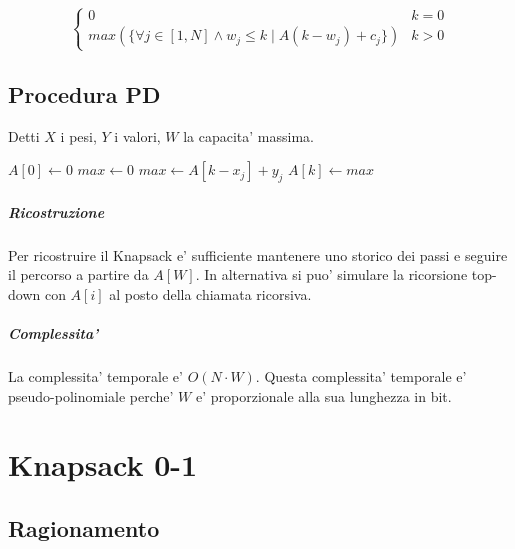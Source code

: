 \[
    \begin{cases}
        \text{$0$} & \text{$k = 0$} \\
        \text{$max(\{\forall j \in [1,N] \land w_j \leq k \mid A(k - w_j) + c_j\})$} & \text{$k > 0$}
    \end{cases}
\]

\newpage

\section{Procedura PD}

Detti $X$ i pesi, $Y$ i valori, $W$ la capacita' massima.

\begin{algorithm}
    \begin{algorithmic}
            \State $A[0] \gets 0$
                \State $max \gets 0$
                        \State $max \gets A[k - x_j] + y_j$
                    \EndIf
                \EndFor
                \State $A[k] \gets max$
            \EndFor
        \EndProcedure
    \end{algorithmic}
\end{algorithm}

\paragraph{Ricostruzione}

Per ricostruire il Knapsack e' sufficiente mantenere uno storico dei passi e seguire il percorso a partire da $A[W]$.
In alternativa si puo' simulare la ricorsione top-down con $A[i]$ al posto della chiamata ricorsiva.

\paragraph{Complessita'}

La complessita' temporale e' $O(N \cdot W)$.
Questa complessita' temporale e' pseudo-polinomiale perche' $W$ e' proporzionale alla sua lunghezza in bit.

\chapter{Knapsack 0-1}

\section{Ragionamento}

